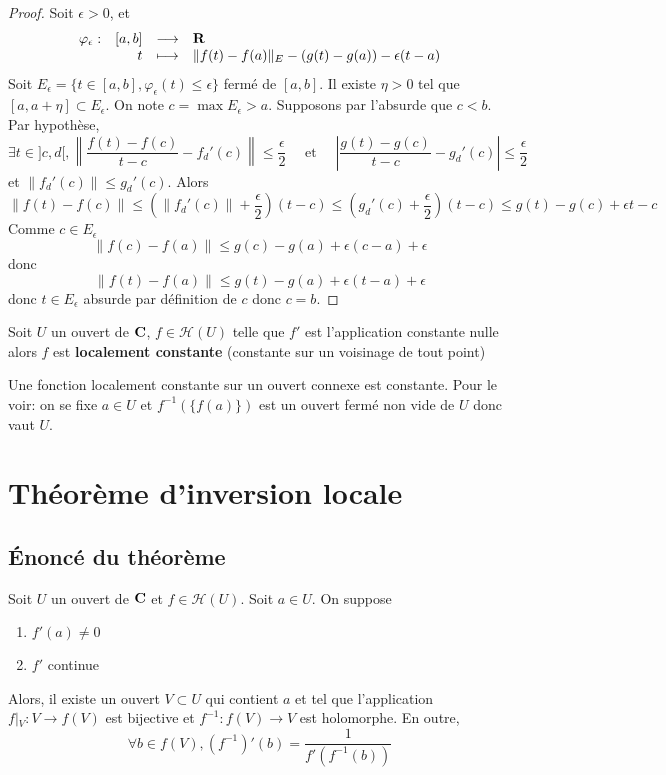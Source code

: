 \begin{proof}
Soit $\epsilon >0$, et \[
\begin{array}{rrcl}
    \varphi_\epsilon:& [a,b] & \longrightarrow & \mathbf R \\
               & t & \longmapsto & \displaystyle \|f(t)-f(a)\|_E-(g(t)-g(a))-\epsilon(t-a)
\end{array}
\] 
Soit $E_\epsilon=\{t \in  [a, b], \varphi_\epsilon(t)\leq \epsilon\}$ fermé de $[a, b]$. Il existe  $\eta>0$ tel que  $[a, a+\eta]\subset E_\epsilon$. On note  $c=\max E_\epsilon>a$. Supposons par l'absurde que  $c<b$. Par hypothèse,  \[
    \exists  t \in  ]c, d[, \left\|\frac{f(t)-f(c)}{t-c}-f_d'(c)\right\|\leq \frac{\epsilon}{2}\quad \text{ et } \quad  \left| \frac{g(t)-g(c)}{t-c}-g_d'(c) \right|\leq \frac{\epsilon}{2}
\] 
et $\|f_d'(c)\|\leq g_d'(c)$. Alors 
\[
    \|f(t)-f(c)\|\leq \left( \|f_d'(c)\|+\frac{\epsilon}{2} \right) (t-c)\leq \left( g_d'(c)+ \frac{\epsilon}{2} \right)(t-c)\leq g(t)-g(c)+\epsilon{t-c}
\] 
Comme $c \in  E_\epsilon$ \[
    \|f(c)-f(a)\|\leq  g(c)-g(a)+\epsilon(c-a)+\epsilon
\] 
donc \[
    \|f(t)-f(a)\|\leq g(t)-g(a)+\epsilon(t-a)+\epsilon
\] 
donc $t \in  E_\epsilon$ absurde par définition de $c$ donc $c=b$.
\end{proof}

\begin{cor}
    Soit $U$ un ouvert de  $\mathbf C$, $f \in  \mathcal  H(U)$ telle que $f'$ est l'application constante nulle alors  $f$ est \textbf{localement constante} (constante sur un voisinage de tout point)
\end{cor}

\begin{rem}
    Une fonction localement constante sur un ouvert connexe est constante. Pour le voir: on se fixe $a \in  U$ et $f^{-1}(\{f(a)\})$ est un ouvert fermé non vide de $U$ donc vaut  $U$.
\end{rem}

\section{Théorème d'inversion locale}

\subsection{Énoncé du théorème}

\begin{thm}
    Soit $U$ un ouvert de  $\mathbf C$ et $f \in  \mathcal  H(U)$. Soit $a \in  U$. On suppose \begin{enumerate}[label=(\emph{\roman*})]
    \item $f'(a)\neq 0$
    \item $f'$ continue
\end{enumerate}
Alors, il existe un ouvert $V\subset U$ qui contient $a$ et tel que l'application  $f\left|_{V}\right.:V\longrightarrow f(V)$ est bijective et $f^{-1}:f(V)\longrightarrow V$ est holomorphe. En outre, \[
    \forall  b \in  f(V), (f^{-1})'(b)=\frac1{f'(f^{-1}(b))}
\] 
\end{thm}

